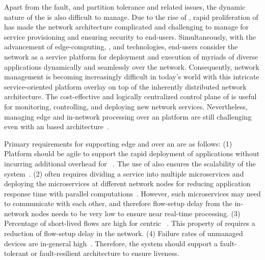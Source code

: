 Apart from the fault, and partition tolerance and  related issues, the dynamic nature of the  is also difficult to manage. Due to the rise of , rapid proliferation of  has made the network architecture complicated and challenging to manage for service provisioning and ensuring security to end-users. Simultaneously, with the advancement of edge-computing, , and  technologies, end-users consider the network as a service platform for deployment and execution of myriads of diverse applications dynamically and seamlessly over the network.  Consequently, network management is becoming increasingly difficult in today's world with this intricate service-oriented platform overlay on top of the inherently distributed  network architecture. The cost-effective and logically centralized control plane of  is useful for monitoring, controlling, and deploying new network services. Nevertheless, managing edge and in-network processing over an  platform are still challenging even with an  based architecture~\cite{baktir2017can}.

Primary requirements for supporting edge and  over an  are as follows: (1) Platform should be agile to support the rapid deployment of applications without incurring additional overhead for ~\cite{vaquero2014finding}. The use of  also ensures the scalability of the system~\cite{chiang2017clarifying}. (2)  often requires dividing a service into multiple microservices and deploying the microservices at different network nodes for reducing application response time with parallel computations~\cite{selimi2017practical}. However, such microservices may need to communicate with each other, and therefore flow-setup delay from the in-network nodes needs to be very low to ensure near real-time processing. (3) Percentage of short-lived flows are high for  centric ~\cite{Shafiq2013Dec}. This property of  requires a reduction of flow-setup delay in the network. (4) Failure rates of unmanaged  devices are in-general high~\cite{kaiwartya2018virtualization}. Therefore, the system should support a fault-tolerant or fault-resilient architecture to ensure liveness. 

